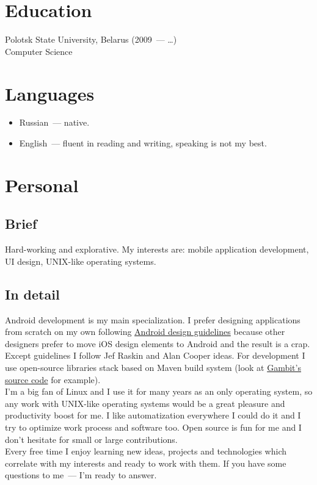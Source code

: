  \section*{Education}

    Polotsk State University, Belarus (2009~--- \dots) \\
    Computer Science

  \section*{Languages}

    \begin{itemize}

      \item Russian~--- native.

      \item English~--- fluent in reading and writing, speaking is not my best.

    \end{itemize}

  \section*{Personal}

    \subsection*{Brief}

      Hard-working and explorative. My interests are:
      mobile application development, UI design, UNIX-like
      operating systems.

    \subsection*{In detail}

      Android development is my main specialization. I prefer designing
      applications from scratch on my own following
      \href{https://developer.android.com/design/}{Android design guidelines}
      because other designers prefer to move iOS design elements to Android
      and the result is a crap. Except guidelines I follow Jef Raskin
      and Alan Cooper ideas. For development I use open-source libraries
      stack based on Maven build system (look at
      \href{https://github.com/ming13/gambit}{Gambit’s source code} for example). \\

      I’m a big fan of Linux and I use it for many years as
      an only operating system, so any work with UNIX-like operating systems
      would be a great pleasure and productivity boost for me.
      I like automatization everywhere I could do it and I try to optimize
      work process and software too. Open source is fun for me and
      I don’t hesitate for small or large contributions. \\

      Every free time I enjoy learning new ideas, projects and technologies
      which correlate with my interests and ready to work with them.
      If you have some questions to me~--- I’m ready to answer.

  \vfill


